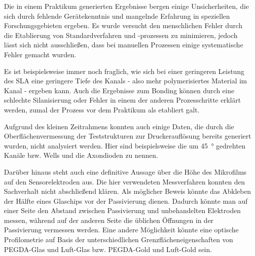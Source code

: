 Die in einem Praktikum generierten Ergebnisse bergen einige Unsicherheiten, die sich durch fehlende Gerätekenntnis und mangelnde Erfahrung in speziellen Forschungsgebieten ergeben. Es wurde versucht den menschlichen Fehler durch die Etablierung von Standardverfahren und -prozessen zu minimieren, jedoch lässt sich nicht ausschließen, dass bei manuellen Prozessen einige systematische Fehler gemacht wurden.

Es ist beispielsweise immer noch fraglich, wie sich bei einer geringeren Leistung des SLA eine geringere Tiefe des Kanals - also mehr polymerisiertes Material im Kanal - ergeben kann. Auch die Ergebnisse zum Bonding können durch eine schlechte Silanisierung oder Fehler in einem der anderen Prozesschritte erklärt werden, zumal der Prozess vor dem Praktikum als etabliert galt. 

Aufgrund des kleinen Zeitrahmens konnten auch einige Daten, die durch die Oberflächenvermessung der Teststrukturen zur Druckerauflösung bereits generiert wurden, nicht analysiert werden. Hier sind beispielsweise die um \SI{45}{\degree} gedrehten Kanäle bzw. Wells und die Axondioden zu nennen.

Darüber hinaus steht auch eine definitive Aussage über die Höhe des Mikrofilms auf den Sensorelektroden aus. Die hier verwendeten Messverfahren konnten den Sachverhalt nicht abschließend klären. Als möglicher Beweis könnte das Abkleben der Hälfte eines Glaschips vor der Passivierung dienen. Dadurch könnte man auf einer Seite den Abstand zwischen Passivierung und unbehandelten Elektroden messen, während auf der anderen Seite die üblichen Öffnungen in der Passivierung vermessen werden. Eine andere Möglichkeit könnte eine optische Profilometrie auf Basis der unterschiedlichen Grenzflächeneigenschaften von PEGDA-Glas und Luft-Glas bzw. PEGDA-Gold und Luft-Gold sein.

